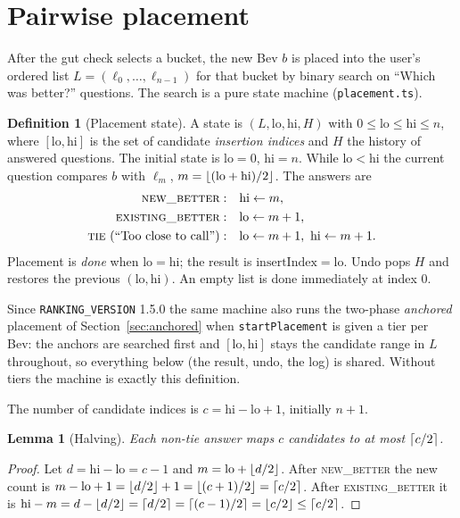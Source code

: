 \documentclass[11pt]{article}
\DeclarePairedDelimiter\floor{\lfloor}{\rfloor}
\DeclarePairedDelimiter\ceil{\lceil}{\rceil}
\newcommand{\code}[1]{\texttt{#1}}
\theoremstyle{plain}
\newtheorem{lemma}[theorem]{Lemma}
\theoremstyle{definition}
\newtheorem{definition}[theorem]{Definition}
\theoremstyle{remark}
\begin{document}
\section{Pairwise placement}\label{sec:placement}

After the gut check selects a bucket, the new Bev $b$ is placed into the user's ordered list $L = (\ell_0, \dots, \ell_{n-1})$ for that bucket by binary search on ``Which was better?'' questions. The search is a pure state machine (\code{placement.ts}).

\begin{definition}[Placement state]
A state is $(L, \mathrm{lo}, \mathrm{hi}, H)$ with $0 \le \mathrm{lo} \le \mathrm{hi} \le n$, where $[\mathrm{lo}, \mathrm{hi}]$ is the set of candidate \emph{insertion indices} and $H$ the history of answered questions. The initial state is $\mathrm{lo} = 0$, $\mathrm{hi} = n$. While $\mathrm{lo} < \mathrm{hi}$ the current question compares $b$ with $\ell_m$, $m = \floor{(\mathrm{lo} + \mathrm{hi})/2}$. The answers are
\begin{align*}
\textsc{new\_better}: &\quad \mathrm{hi} \gets m, \\
\textsc{existing\_better}: &\quad \mathrm{lo} \gets m + 1, \\
\textsc{tie}\ \text{(``Too close to call'')}: &\quad \mathrm{lo} \gets m + 1,\ \mathrm{hi} \gets m + 1 .
\end{align*}
Placement is \emph{done} when $\mathrm{lo} = \mathrm{hi}$; the result is $\mathrm{insertIndex} = \mathrm{lo}$. Undo pops $H$ and restores the previous $(\mathrm{lo}, \mathrm{hi})$. An empty list is done immediately at index $0$.
\end{definition}

Since \code{RANKING\_VERSION} 1.5.0 the same machine also runs the two-phase \emph{anchored} placement of Section~\ref{sec:anchored} when \code{startPlacement} is given a tier per Bev: the anchors are searched first and $[\mathrm{lo}, \mathrm{hi}]$ stays the candidate range in $L$ throughout, so everything below (the result, undo, the log) is shared. Without tiers the machine is exactly this definition.

The number of candidate indices is $c = \mathrm{hi} - \mathrm{lo} + 1$, initially $n + 1$.

\begin{lemma}[Halving]\label{lem:halving}
Each non-tie answer maps $c$ candidates to at most $\ceil{c/2}$.
\end{lemma}
\begin{proof}
Let $d = \mathrm{hi} - \mathrm{lo} = c - 1$ and $m = \mathrm{lo} + \floor{d/2}$. After \textsc{new\_better} the new count is $m - \mathrm{lo} + 1 = \floor{d/2} + 1 = \floor{(c+1)/2} = \ceil{c/2}$. After \textsc{existing\_better} it is $\mathrm{hi} - m = d - \floor{d/2} = \ceil{d/2} = \ceil{(c-1)/2} = \floor{c/2} \le \ceil{c/2}$.
\end{proof}
\end{document}
